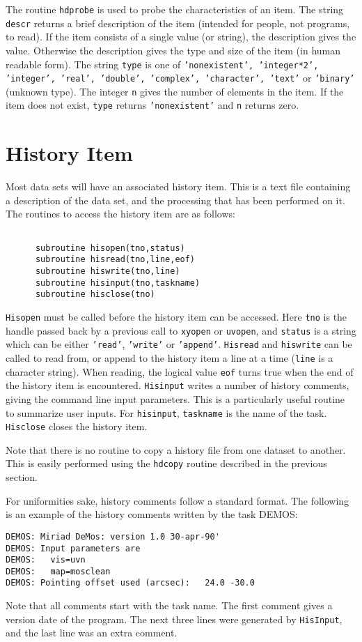 \documentclass{report}
\begin{document}
The routine {\tt hdprobe} is used to probe the characteristics of an
item.  The string {\tt descr} returns a brief description of the item
(intended for people, not programs, to read). If the item consists of a
single value (or string), the description gives the value. Otherwise
the description gives the type and size of the item (in human readable
form). The string {\tt type} is one of {\tt 'nonexistent',
'integer*2', 'integer', 'real', 'double', 'complex', 'character', 'text'}
or {\tt 'binary'} (unknown type). The integer {\tt n} gives the number
of elements in the item. If the item does not exist, {\tt type} returns
{\tt 'nonexistent'} and {\tt n} returns zero.

\section{History Item}
Most data sets will have an associated history item. This is a text file
containing a description of the data set, and the processing that has been
performed on it. The routines to access the history item are as follows:
\begin{verbatim}

      subroutine hisopen(tno,status)
      subroutine hisread(tno,line,eof)
      subroutine hiswrite(tno,line)
      subroutine hisinput(tno,taskname)
      subroutine hisclose(tno)

\end{verbatim}
{\tt Hisopen} must be called before the history item can be accessed. Here
{\tt tno} is the handle passed back by a previous call to {\tt xyopen}
or {\tt uvopen}, and {\tt status} is a string which can be either
{\tt 'read'}, {\tt 'write'} or {\tt 'append'}. {\tt Hisread} and {\tt hiswrite} can be
called to read from, or append to the history item a line at a time
({\tt line} is a character string). When reading, the
logical value {\tt eof} turns true when the end of the history item is
encountered. {\tt Hisinput} writes a number of history comments, giving
the command line input parameters. This is a particularly useful routine
to summarize user inputs. For {\tt hisinput}, {\tt taskname} is the name
of the task. {\tt Hisclose} closes the history item.

Note that there is no routine to copy a history file from one dataset to
another. This is easily performed using the {\tt hdcopy} routine described
in the previous section.

For uniformities sake, history comments follow a standard format. The
following is an example of the history comments written by the task
DEMOS:
\begin{verbatim}
DEMOS: Miriad DeMos: version 1.0 30-apr-90'
DEMOS: Input parameters are
DEMOS:   vis=uvn
DEMOS:   map=mosclean
DEMOS: Pointing offset used (arcsec):   24.0 -30.0
\end{verbatim}
Note that all comments start with the task name. The first comment gives a
version date of the program. The next
three lines were generated by {\tt HisInput}, and the last line was an
extra comment.
\end{document}
